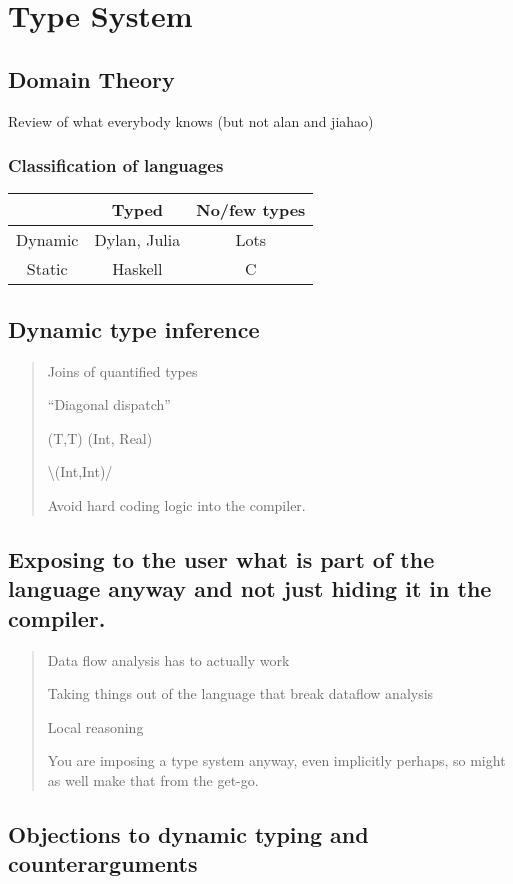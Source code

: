 \documentclass[12pt]{mitthesis}
\begin{document}
\chapter{Type System}


\section{Domain Theory}

Review of what everybody knows (but not alan and jiahao)


\subsection{Classification of languages}

\begin{tabular}{|c||c|c|}
\hline 
 & Typed & No/few types\tabularnewline
\hline 
\hline 
Dynamic & Dylan, Julia & Lots\tabularnewline
\hline 
Static & Haskell & C\tabularnewline
\hline 
\end{tabular}


\section{Dynamic type inference}
\begin{quotation}
Joins of quantified types

``Diagonal dispatch''

(T,T) (Int, Real)

\textbackslash{}(Int,Int)/

Avoid hard coding logic into the compiler.
\end{quotation}

\section{Exposing to the user what is part of the language anyway and not
just hiding it in the compiler.}
\begin{quotation}
Data flow analysis has to actually work

Taking things out of the language that break dataflow analysis

Local reasoning

You are imposing a type system anyway, even implicitly perhaps, so
might as well make that from the get-go.
\end{quotation}

\section{Objections to dynamic typing and counterarguments}
\end{document}

